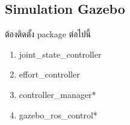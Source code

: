 \clearpage
\subsection{Simulation Gazebo}
ต้องติดตั้ง package ต่อไปนี้


\begin{enumerate}[label=\arabic*, leftmargin=1.5cm]
	\item joint\_state\_controller
	\item effort\_controller
	\item controller\_manager*
	\item gazebo\_ros\_control*
\end{enumerate}
